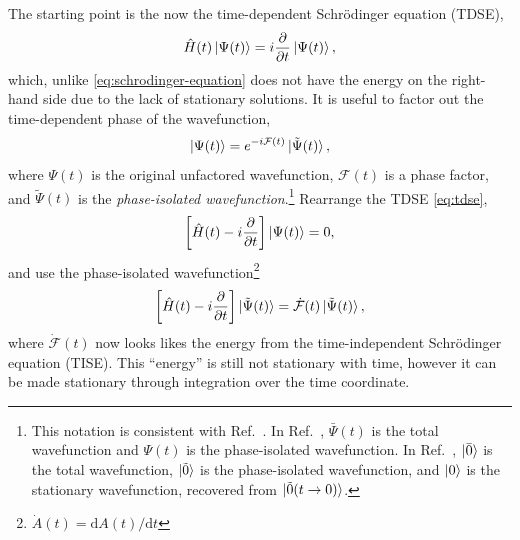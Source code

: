 \documentclass[%
class = book,%
crop = false,%
float = true,%
multi = true,%
preview = false,%
]{standalone}
\newcommand\schrod{Schr{\"{o}}dinger}
\begin{document}
The starting point is the now the time-dependent \schrod{} equation (TDSE),
\begin{equation}
  \label{eq:tdse}
  \hat{H}(t) \ket{\Psi(t)} = i\frac{\partial}{\partial t} \ket{\Psi(t)},
\end{equation}
which, unlike \eqref{eq:schrodinger-equation} does not have the energy on the right-hand side due to the lack of stationary solutions. It is useful to factor out the time-dependent phase of the wavefunction,
\begin{equation}
  \label{eq:phase-isolated-wavefunction}
  \ket{\Psi(t)} = e^{-i\mathcal{F}(t)} \ket{\tilde{\Psi}(t)},
\end{equation}
where \(\Psi(t)\) is the original unfactored wavefunction, \(\mathcal{F}(t)\) is a phase factor, and \(\tilde{\Psi}(t)\) is the \emph{phase-isolated wavefunction}.\footnote{This notation is consistent with Ref.~\parencite{gauss2000}. In Ref.~\parencite{Toulouse2015}, \(\bar{\Psi}(t)\) is the total wavefunction and \(\Psi(t)\) is the phase-isolated wavefunction. In Ref.~\parencite{Christiansen1998}, \(\ket{\bar{0}}\) is the total wavefunction, \(\ket{\tilde{0}}\) is the phase-isolated wavefunction, and \(\ket{0}\) is the stationary wavefunction, recovered from \(\ket{\tilde{0}(t \rightarrow 0)}\).} Rearrange the TDSE \eqref{eq:tdse},
\begin{equation}
  \label{eq:tdse-rearranged}
  \left[ \hat{H}(t) - i\frac{\partial}{\partial t} \right] \ket{\Psi(t)} = 0,
\end{equation}
and use the phase-isolated wavefunction\footnote{\(\dot{A}(t) = \mathrm{d}A(t)/\mathrm{d}t\)}
\begin{equation}
  \label{eq:phase-isolated-tdse}
  \left[ \hat{H}(t) - i\frac{\partial}{\partial t} \right] \ket{\tilde{\Psi}(t)} = \dot{\mathcal{F}}(t) \ket{\tilde{\Psi}(t)},
\end{equation}
where \(\dot{\mathcal{F}}(t)\) now looks likes the energy from the time-independent \schrod{} equation (TISE). This ``energy'' is still not stationary with time, however it can be made stationary through integration over the time coordinate.
\end{document}
